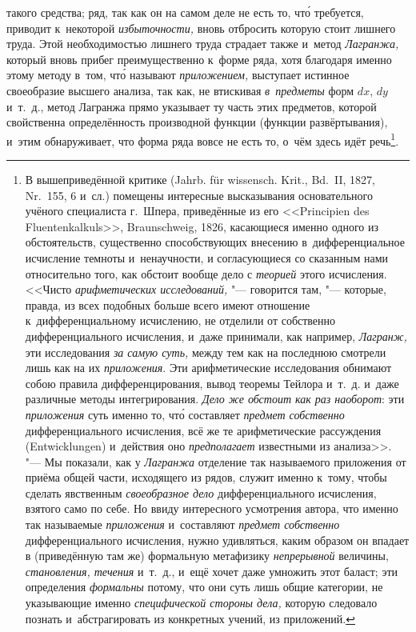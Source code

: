 такого средства; ряд, так как он на самом деле не есть то, чт\'{о} требуется,
приводит к~некоторой {\em избыточности,} вновь отбросить которую стоит лишнего
труда. Этой необходимостью лишнего труда страдает также и~метод {\em Лагранжа,}
который вновь прибег преимущественно к~форме ряда, хотя благодаря именно этому
методу в~том, чт\'{о} называют {\em приложением,} выступает истинное своеобразие
высшего анализа, так как, не втискивая {\em в~предметы} форм $dx$, $dy$
и~т.~д., метод Лагранжа прямо указывает ту часть этих предметов, которой
свойственна определённость производной функции (функции развёртывания), и~этим
обнаруживает, что форма ряда вовсе не есть то, о~чём здесь идёт речь\footnote{В
вышеприведённой критике (Jahrb. für wissensch. Krit., Bd.~II, 1827, Nr.~155, 6
и~сл.) помещены интересные высказывания основательного учёного специалиста
г.~Шпера, приведённые из его <<Prin\-ci\-pien des Flu\-enten\-kal\-kuls>>,
Braun\-schweig, 1826, касающиеся именно одного из обстоятельств, существенно
способствующих внесению в~дифференциальное исчисление темноты и~ненаучности, и
согласующиеся со сказанным нами относительно того, как обстоит вообще дело с
{\em теорией} этого исчисления. <<Чисто {\em арифметических исследований,} "---
говорится там, "--- которые, правда, из всех подобных больше всего имеют
отношение к~дифференциальному исчислению, не отделили от собственно
дифференциального исчисления, и~даже принимали, как например, {\em Лагранж,}
эти исследования {\em за самую суть,} между тем как на последнюю смотрели лишь
как на их {\em приложения}. Эти арифметические исследования обнимают собою
правила дифференцирования, вывод теоремы Тейлора и~т.~д. и~даже различные
методы интегрирования. {\em Дело же обстоит как раз наоборот}: эти
{\em приложения} суть именно то, чт\'{о} составляет {\em предмет собственно}
дифференциального исчисления, всё же те арифметические рассуждения
(Ent\-wick\-lungen) и~действия оно {\em предполагает} известными из анализа>>.
"--- Мы показали, как у {\em Лагранжа} отделение так называемого приложения от
приёма общей части, исходящего из рядов, служит именно к~тому, чтобы сделать
явственным {\em своеобразное дело} дифференциального исчисления, взятого само
по себе. Но ввиду интересного усмотрения автора, что именно так называемые
{\em приложения} и~составляют {\em предмет собственно} дифференциального
исчисления, нужно удивляться, каким образом он впадает в (приведённую там же)
формальную метафизику {\em непрерывной} величины, {\em становления, течения}
и~т.~д., и~ещё хочет даже умножить этот баласт; эти определения {\em формальны}
потому, что они суть лишь общие категории, не указывающие именно
{\em специфической стороны дела,} которую следовало познать и~абстрагировать
из конкретных учений, из приложений.}.

